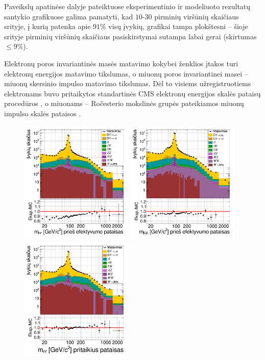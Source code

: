 \documentclass[a4paper, 12pt, twoside]{article}
\newlength\q
\begin{document}
Paveikslų apatinėse dalyje pateiktuose eksperimentinio ir modeliuoto rezultatų santykio grafikuose galima pamatyti, kad
$10$-$30$ pirminių viršūnių skaičiaus srityje, į kurią patenka apie $91\%$ visų įvykių, grafikai tampa plokštesni --
šioje srityje pirminių viršūnių skaičiaus pasiskirstymai sutampa labai gerai (skirtumas $\leqslant 9\%$).

Elektronų poros invariantinės masės matavimo kokybei ženklios įtakos turi elektronų energijos matavimo
tikslumas, o miuonų poros invariantinei masei -- miuonų skersinio impulso matavimo tikslumas.
Dėl to visiems užregistruotiems elektronams buvo pritaikytos standartinės CMS elektronų energijos skalės
pataisų procedūros \cite{Ecorr}, o miuonams -- Ročesterio mokslinės grupės pateikiamos miuonų impulso
skalės pataisos \cite{RocCorr}.

\begin{figure}[tbp]
	\includegraphics[width=0.48\textwidth]{ee_mass_beforeSF.png}
	\includegraphics[width=0.48\textwidth]{mumu_mass_beforeSF.png}
	\includegraphics[width=0.48\textwidth]{ee_mass_after.png}

\end{figure}
\end{document}
